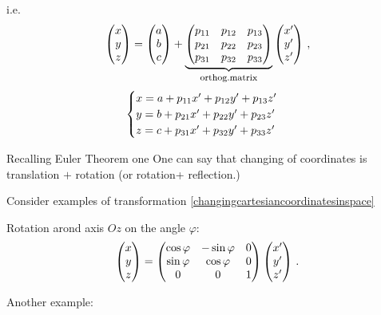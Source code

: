 \documentclass[12pt]{article}
\numberwithin{equation}{section}
\begin{document}
i.e. \begin{equation*}
  \begin{pmatrix}
         x \cr
        y\cr
       z\cr
   \end{pmatrix}
         =
  \begin{pmatrix}
         a \cr
        b\cr
       c\cr
   \end{pmatrix}
              +  
         \underbrace
         {
      \begin{pmatrix}
    p_{11} &p_{12} &p_{13}\cr
    p_{21} &p_{22} &p_{23}\cr
    p_{31} &p_{32} &p_{33}\cr
         \end{pmatrix}
         }_{\hbox 
    {\footnotesize orthog.matrix}}
           \begin{pmatrix}
         x'\cr
         y'\cr
         z'\cr
   \end{pmatrix}\,,
\end{equation*}
\begin{equation}\label{changingcartesiancoordinatesinspace}
\begin{cases}
    x=a+p_{11}x'+p_{12}y'+p_{13}z'\cr
    y=b+p_{21}x'+p_{22}y'+p_{23}z'\cr
    z=c+p_{31}x'+p_{32}y'+p_{33}z'\cr
 \end{cases}
   \end{equation}




Recalling Euler Theorem one 
One can say that changing  of coordinates
is translation $+$ rotation (or rotation+ reflection.)



\m

  Consider examples of transformation
\eqref{changingcartesiancoordinatesinspace}


Rotation arond axis $Oz$ on the angle $\varphi$:
\begin{equation*}
  \begin{pmatrix}
         x \cr
        y\cr
       z\cr
   \end{pmatrix}
         =
      \begin{pmatrix}
    \cos\varphi &-\sin\varphi &0\cr
    \sin\varphi &\cos\varphi &0\cr
    0 &0 &1\cr
         \end{pmatrix}
           \begin{pmatrix}
         x'\cr
        y'\cr
        z'\cr
   \end{pmatrix}\,.
\end{equation*}

Another example:
\end{document}
